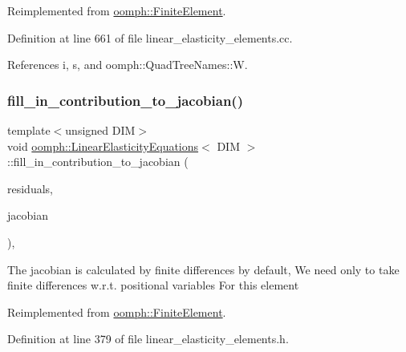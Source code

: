 Reimplemented from \hyperlink{classoomph_1_1FiniteElement_a7f67853506dc73fa6b7505108de22d1f}{oomph\+::\+Finite\+Element}.



Definition at line 661 of file linear\+\_\+elasticity\+\_\+elements.\+cc.



References i, s, and oomph\+::\+Quad\+Tree\+Names\+::W.

\mbox{\label{classoomph_1_1LinearElasticityEquations_ad09269e02262abfaae2176048066365b}} 
\subsubsection{\texorpdfstring{fill\+\_\+in\+\_\+contribution\+\_\+to\+\_\+jacobian()}{fill\_in\_contribution\_to\_jacobian()}}
{\footnotesize\ttfamily template$<$unsigned D\+IM$>$ \\
void \hyperlink{classoomph_1_1LinearElasticityEquations}{oomph\+::\+Linear\+Elasticity\+Equations}$<$ D\+IM $>$\+::fill\+\_\+in\+\_\+contribution\+\_\+to\+\_\+jacobian (\begin{DoxyParamCaption}\item[{\hyperlink{classoomph_1_1Vector}{Vector}$<$ double $>$ \&}]{residuals,  }\item[{\hyperlink{classoomph_1_1DenseMatrix}{Dense\+Matrix}$<$ double $>$ \&}]{jacobian }\end{DoxyParamCaption})\hspace{0.3cm}{\ttfamily [inline]}, {\ttfamily [virtual]}}

The jacobian is calculated by finite differences by default, We need only to take finite differences w.\+r.\+t. positional variables For this element 

Reimplemented from \hyperlink{classoomph_1_1FiniteElement_a0ae7af222af38a0d53bf283dc85bdfea}{oomph\+::\+Finite\+Element}.



Definition at line 379 of file linear\+\_\+elasticity\+\_\+elements.\+h.



